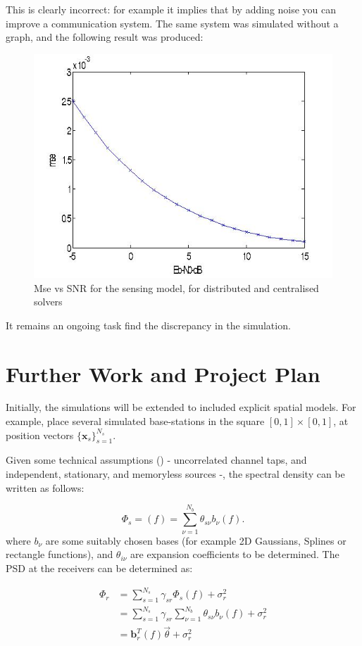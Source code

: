 This is clearly incorrect: for example it implies that by adding noise you can improve a communication system. The same system was simulated without a graph, and the following result was produced:

\begin{figure}
\centering
\includegraphics[height = 7 cm]{ebn0bbvsmse.jpg}
\caption{Mse vs SNR for the sensing model, for distributed and centralised solvers}
\label{msevssnr}
\end{figure}

It remains an ongoing task find the discrepancy in the simulation.

\section{Further Work and Project Plan}
Initially, the simulations will be extended to included explicit spatial models. For example, place several simulated base-stations in the square 
\( \left[ 0,1 \right] \times \left[ 0,1 \right] \), at position vectors \(  \{ \textbf{x}_s \}_{s=1}^{N_s} \). 

Given some technical assumptions (\cite{Giannakis2}) - uncorrelated channel taps, and independent, stationary, and memoryless sources -, the spectral density can be written as follows:

\begin{equation}
\Phi_s =\left(f\right) = \sum_{\nu = 1}^{N_b} \theta_{s\nu}b_{\nu}\left(f\right).
\end{equation}
where \(b_{\nu}\) are some suitably chosen bases (for example 2D Gaussians, Splines or rectangle functions), and \(\theta_{i\nu}\) are expansion coefficients to be determined. The PSD at the receivers can be determined as:

\begin{align}
\Phi_r &= \sum_{s=1}^{N_s} \gamma_{sr} \Phi_s \left(f \right) + \sigma_{r}^2 \\
&= \sum_{s=1}^{N_s}\gamma_{sr}\sum_{\nu = 1}^{N_b} \theta_{s\nu}b_{\nu}\left(f\right) +\sigma_{r}^2 \\
&= \textbf{b}_r^T \left(f\right) \vec{ \theta }  + \sigma_{r}^2
\end{align}

